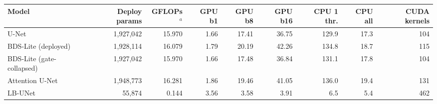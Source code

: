 \begin{tabular}{lrrrrrrrr}
\toprule
Model & Deploy params & GFLOPs$^a$ & GPU b1 & GPU b8 & GPU b16 & CPU 1 thr. & CPU all & CUDA kernels \\
\midrule
U-Net & 1,927,042 & 15.970 & 1.66 & 17.41 & 36.75 & 129.9 & 17.3 & 104 \\
BDS-Lite (deployed) & 1,928,114 & 16.079 & 1.79 & 20.19 & 42.26 & 134.8 & 18.7 & 115 \\
BDS-Lite (gate-collapsed) & 1,927,042 & 15.970 & 1.66 & 17.48 & 36.84 & 131.1 & 17.8 & 104 \\
Attention U-Net & 1,948,773 & 16.281 & 1.86 & 19.46 & 41.05 & 136.0 & 19.4 & 131 \\
LB-UNet & 55,874 & 0.144 & 3.56 & 3.58 & 3.91 & 6.5 & 5.4 & 462 \\
\bottomrule
\end{tabular}
